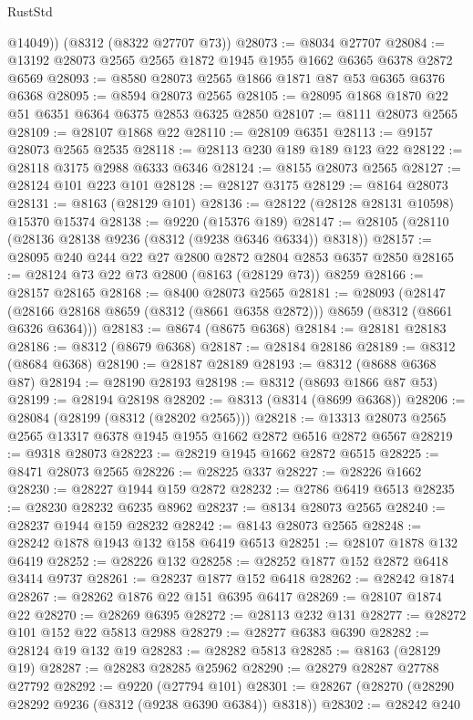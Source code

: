 \begin{lexlean}{RustStd}
\begin{coremodule}
        @14049))
    (@8312 (@8322 @27707 @73))
@28073 := @8034 @27707
@28084 := @13192 @28073 @2565 @2565 @1872 @1945 @1955 @1662 @6365 @6378 @2872 @6569
@28093 := @8580 @28073 @2565 @1866 @1871 @87 @53 @6365 @6376 @6368
@28095 := @8594 @28073 @2565
@28105 := @28095 @1868 @1870 @22 @51 @6351 @6364 @6375 @2853 @6325 @2850
@28107 := @8111 @28073 @2565
@28109 := @28107 @1868 @22
@28110 := @28109 @6351
@28113 := @9157 @28073 @2565 @2535
@28118 := @28113 @230 @189 @189 @123 @22
@28122 := @28118 @3175 @2988 @6333 @6346
@28124 := @8155 @28073 @2565
@28127 := @28124 @101 @223 @101
@28128 := @28127 @3175
@28129 := @8164 @28073
@28131 := @8163 (@28129 @101)
@28136 := @28122 (@28128 @28131 @10598) @15370 @15374
@28138 := @9220 (@15376 @189)
@28147 := @28105 (@28110 (@28136 @28138 @9236 (@8312 (@9238 @6346 @6334)) @8318))
@28157 := @28095 @240 @244 @22 @27 @2800 @2872 @2804 @2853 @6357 @2850
@28165 := @28124 @73 @22 @73 @2800 (@8163 (@28129 @73)) @8259
@28166 := @28157 @28165
@28168 := @8400 @28073 @2565
@28181 := @28093
    (@28147 (@28166 @28168 @8659 (@8312 (@8661 @6358 @2872))) @8659 (@8312 (@8661 @6326 @6364)))
@28183 := @8674 (@8675 @6368)
@28184 := @28181 @28183
@28186 := @8312 (@8679 @6368)
@28187 := @28184 @28186
@28189 := @8312 (@8684 @6368)
@28190 := @28187 @28189
@28193 := @8312 (@8688 @6368 @87)
@28194 := @28190 @28193
@28198 := @8312 (@8693 @1866 @87 @53)
@28199 := @28194 @28198
@28202 := @8313 (@8314 (@8699 @6368))
@28206 := @28084 (@28199 (@8312 (@28202 @2565)))
@28218 := @13313 @28073 @2565 @2565 @13317 @6378 @1945 @1955 @1662 @2872 @6516 @2872 @6567
@28219 := @9318 @28073
@28223 := @28219 @1945 @1662 @2872 @6515
@28225 := @8471 @28073 @2565
@28226 := @28225 @337
@28227 := @28226 @1662
@28230 := @28227 @1944 @159 @2872
@28232 := @2786 @6419 @6513
@28235 := @28230 @28232 @6235 @8962
@28237 := @8134 @28073 @2565
@28240 := @28237 @1944 @159 @28232
@28242 := @8143 @28073 @2565
@28248 := @28242 @1878 @1943 @132 @158 @6419 @6513
@28251 := @28107 @1878 @132 @6419
@28252 := @28226 @132
@28258 := @28252 @1877 @152 @2872 @6418 @3414 @9737
@28261 := @28237 @1877 @152 @6418
@28262 := @28242 @1874
@28267 := @28262 @1876 @22 @151 @6395 @6417
@28269 := @28107 @1874 @22
@28270 := @28269 @6395
@28272 := @28113 @232 @131
@28277 := @28272 @101 @152 @22 @5813 @2988
@28279 := @28277 @6383 @6390
@28282 := @28124 @19 @132 @19
@28283 := @28282 @5813
@28285 := @8163 (@28129 @19)
@28287 := @28283 @28285 @25962
@28290 := @28279 @28287 @27788 @27792
@28292 := @9220 (@27794 @101)
@28301 := @28267 (@28270 (@28290 @28292 @9236 (@8312 (@9238 @6390 @6384)) @8318))
@28302 := @28242 @240

\end{coremodule}
\end{lexlean}
